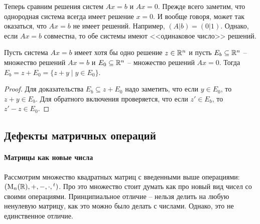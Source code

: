 Теперь сравним решения систем $Ax = b$ и $Ax = 0$. Прежде всего заметим, что однородная система всегда имеет решение $x = 0$. И вообще говоря, может так оказаться, что $Ax = b$ не имеет решений. Например, $(A|b) = (0|1)$. Однако, если $Ax = b$ совместна, то обе системы имеют <<одинаковое число>> решений. 

\begin{claim*}
Пусть система $Ax = b$ имеет хотя бы одно решение $z\in\mathbb R^{n}$ и пусть $E_b\subseteq \mathbb R^{n}$ -- множество решений $Ax = b$ и $E_0\subseteq \mathbb R^{n}$ -- множество решений $Ax = 0$. Тогда $E_b = z + E_0 = \{z +y\mid y\in E_0\}$. 
\end{claim*}
\begin{proof}
Для доказательства $E_b \subseteq z + E_0$ надо заметить, что если $y\in E_0$, то $z+y\in E_b$. Для обратного включения проверяется, что если $z'\in E_b$, то $z' - z\in E_0$.
\end{proof}
\subsection{Дефекты матричных операций}

\paragraph{Матрицы как новые числа}
Рассмотрим множество квадратных матриц с введенными выше операциями: $(\operatorname{M}_{n}(\mathbb R), +, -, \cdot, {}^t)$. Про это множество стоит думать как про новый вид чисел со своими операциями. Принципиальное отличие -- нельзя делить на любую ненулевую матрицу, как это можно было делать с числами. Однако, это не единственное отличие.



